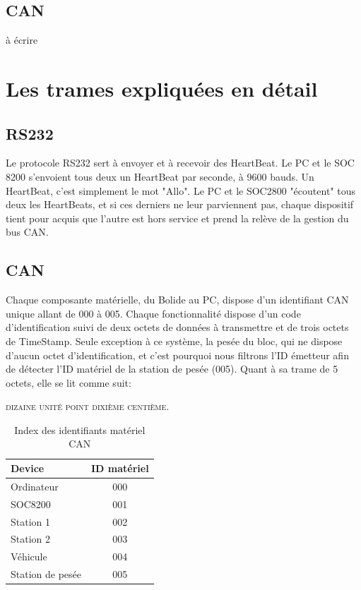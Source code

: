 \documentclass[10pt,a4paper,final]{article}
\begin{document}
\begin{spacing}{1.5}
\subsection{CAN}
à écrire

\pagebreak
\section{Les trames expliquées en détail}

\subsection{RS232}
Le protocole RS232 sert à envoyer et à recevoir des HeartBeat. Le PC et le SOC 8200 s'envoient tous deux un HeartBeat par seconde, à 9600 bauds. Un HeartBeat, c'est simplement le mot "Allo". Le PC et le SOC2800 "écoutent" tous deux les HeartBeats, et si ces derniers ne leur parviennent pas, chaque dispositif tient pour acquis que l'autre est hors service et prend la relève de la gestion du bus CAN.

\subsection{CAN}
Chaque composante matérielle, du Bolide au PC, dispose d'un identifiant CAN unique allant de 000 à 005. Chaque fonctionnalité dispose d'un code d'identification suivi de deux octets de données à transmettre et de trois octets de TimeStamp. Seule exception à ce système, la pesée du bloc, qui ne dispose d'aucun octet d'identification, et c'est pourquoi nous filtrons l'ID émetteur afin de détecter l'ID matériel de la station de pesée (005). Quant à sa trame de 5 octets, elle se lit comme suit: \begin{center}
\textsc{dizaine unité point dixième centième}.
\end{center}

\begin{table}[!ht]
\caption{Index des identifiants matériel CAN}
\medskip
\centering
\begin{tabular}{|l|c|}
\hline 
\textbf{Device} & \textbf{ID matériel} \\ 
\hline 
Ordinateur & 000 \\ 
\hline 
SOC8200 & 001 \\ 
\hline 
Station 1 & 002 \\ 
\hline 
Station 2  & 003 \\ 
\hline
Véhicule & 004 \\
\hline 
Station de pesée  & 005 \\ 
\hline 
\end{tabular} 
\label{tab:testtab1}
\end{table} 


\end{spacing}
\end{document}
